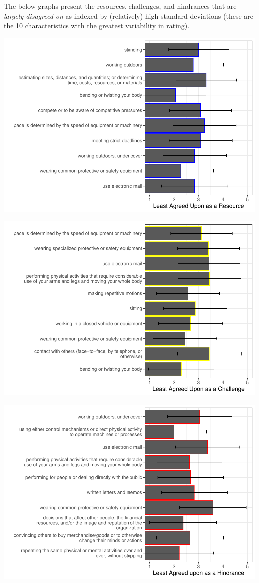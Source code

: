 \documentclass[
  english,
  man]{apa6}
\begin{document}
The below graphs present the resources, challenges, and hindrances that are \emph{largely disagreed on} as indexed by (relatively) high standard deviations (these are the 10 characteristics with the greatest variability in rating).

\includegraphics{Submission_files/figure-latex/resourceshisd-1.pdf}

\includegraphics{Submission_files/figure-latex/challengeshighsd-1.pdf}

\includegraphics{Submission_files/figure-latex/hindranceshighsd-1.pdf}
\end{document}
